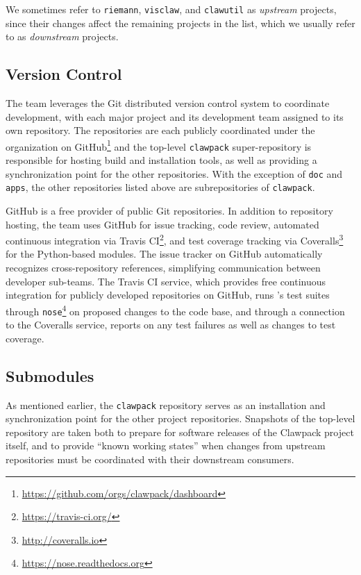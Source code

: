 We sometimes refer to \texttt{riemann}, \texttt{visclaw}, and
\texttt{clawutil} as
\textit{upstream} projects, since their changes affect the
remaining projects in the list, which we usually refer to as
\textit{downstream} projects.

\subsection{Version Control}

The \clawpack team leverages the Git distributed version control system
to coordinate development, with each major project and its development
team assigned to its own repository.  The repositories are each
publicly coordinated under the \clawpack organization on
GitHub\footnote{\url{https://github.com/orgs/clawpack/dashboard}} and the
top-level \texttt{clawpack} super-repository is responsible for hosting
build and installation tools, as well as providing a synchronization
point for the other repositories.  With the exception of \texttt{doc} and \texttt{apps}, the other repositories listed above are subrepositories of \texttt{clawpack}. 

GitHub is a free provider of public Git repositories.  In addition to
repository hosting, the \clawpack team uses GitHub for issue tracking,
code review, automated continuous integration via Travis CI\footnote{\url{https://travis-ci.org/}},
and test coverage tracking via Coveralls\footnote{\url{http://coveralls.io}}
for the Python-based modules.  The issue tracker on
GitHub automatically recognizes cross-repository references,
simplifying communication between \clawpack developer sub-teams.  The
Travis CI service, which provides free continuous integration for
publicly developed repositories on GitHub, runs \clawpack's test
suites through \texttt{nose}\footnote{\url{https://nose.readthedocs.org}}
on proposed changes
to the code base, and through a connection to the Coveralls service,
reports on any test failures as well as changes to test coverage.

\subsection{Submodules}

As mentioned earlier, the \texttt{clawpack} repository serves as an
installation and synchronization point for the other project repositories.
Snapshots of the top-level repository are taken both to prepare for
software releases of the Clawpack project itself, and to provide
``known working states'' when changes from upstream repositories must
be coordinated with their downstream consumers.

